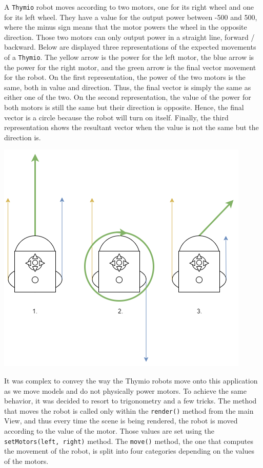 \documentclass{scrreprt}
\begin{document}
A \texttt{Thymio} robot moves according to two motors, one for its right wheel and one for its left wheel. They have a value for the output power between -500 and 500, where the minus sign means that the motor powers the wheel in the opposite direction. 
Those two motors can only output power in a straight line, forward / backward. Below are displayed three representations of the expected movements of a \texttt{Thymio}. The yellow arrow is the power for the left motor, the blue arrow is the power for the right motor, 
and the green arrow is the final vector movement for the robot. On the first representation, the power of the two motors is the same, both in value and direction. Thus, the final vector is simply the same as either one of the two.
On the second representation, the value of the power for both motors is still the same but their direction is opposite. Hence, the final vector is a circle because the robot will turn on itself.
Finally, the third representation shows the resultant vector when the value is not the same but the direction is.

\begin{center}
  \includegraphics[scale=0.8]{./thymio_move}
\end{center}

It was complex to convey the way the Thymio robots move onto this application as we move models and do not physically power motors. To achieve the same behavior, it was decided to resort to trigonometry and a few tricks.
The method that moves the robot is called only within the \texttt{render()} method from the main View, and thus every time the scene is being rendered, the robot is moved according to the value of the motor. 
Those values are set using the \texttt{setMotors(left, right)} method. The \texttt{move()} method, the one that computes the movement of the robot, is split into four categories depending on the values of the motors. 
\end{document}
